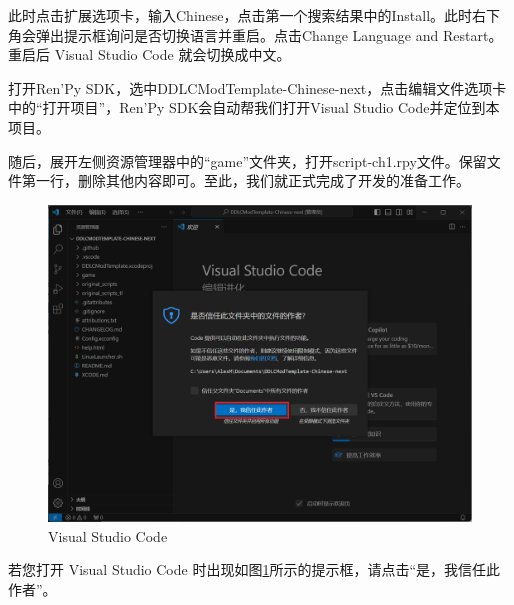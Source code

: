 此时点击扩展选项卡，输入Chinese，点击第一个搜索结果中的Install。此时右下角会弹出提示框询问是否切换语言并重启。点击Change Language and Restart。重启后 Visual Studio Code 就会切换成中文。

打开Ren'Py SDK，选中DDLCModTemplate-Chinese-next，点击编辑文件选项卡中的“打开项目”，Ren'Py SDK会自动帮我们打开Visual Studio Code并定位到本项目。

随后，展开左侧资源管理器中的“game”文件夹，打开script-ch1.rpy文件。保留文件第一行，删除其他内容即可。至此，我们就正式完成了开发的准备工作。

\begin{figure}[htbp]
    \centering
    \includegraphics[scale=.4]{Pictures/2/2.2/2.2.1}
    \caption{Visual Studio Code}
    \label{fig:3.1.2.2}
\end{figure}

\begin{Comment}
    若您打开 Visual Studio Code 时出现如图\ref{fig:3.1.2.2}所示的提示框，请点击“是，我信任此作者”。
\end{Comment}



